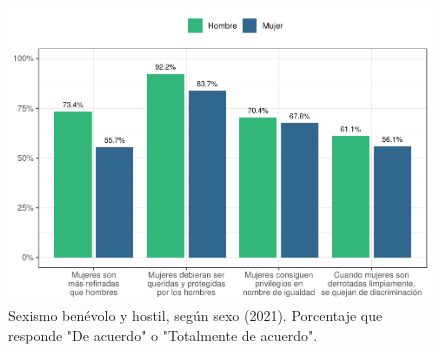 \documentclass[
  12pt,
]{book}
\begin{document}
\begin{figure}

{\centering \includegraphics{reporte-elsoc_files/figure-latex/sexismo-sexo-1} 

}

\caption{Sexismo benévolo y hostil, según sexo (2021). Porcentaje que responde "De acuerdo" o "Totalmente de acuerdo".}\label{fig:sexismo-sexo}
\end{figure}
\end{document}
